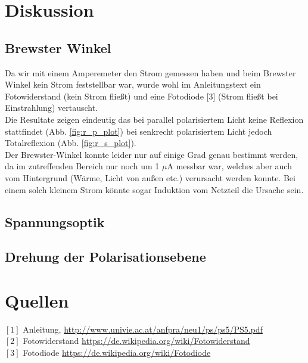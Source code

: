 \documentclass[12pt,a4paper]{article}
\begin{document}
\begin{multicols}{2}
\section{Diskussion}

\subsection{Brewster Winkel}
Da wir mit einem Amperemeter den Strom gemessen haben und beim Brewster Winkel kein Strom feststellbar war, wurde wohl im Anleitungstext ein Fotowiderstand (kein Strom fließt) und eine Fotodiode [3] (Strom fließt bei Einstrahlung) vertauscht. \\
Die Resultate zeigen eindeutig das bei parallel polarisiertem Licht keine Reflexion stattfindet  (Abb. \ref{fig:r_p_plot}) bei senkrecht polarisiertem Licht jedoch Totalreflexion (Abb. \ref{fig:r_s_plot}). \\
Der Brewster-Winkel konnte leider nur auf einige Grad genau bestimmt werden, da im zutreffenden Bereich nur noch um 1 $\mu$A messbar war, welches aber auch vom Hintergrund (Wärme, Licht von außen etc.) verursacht werden konnte. Bei einem solch kleinem Strom könnte sogar Induktion vom Netzteil die Ursache sein.


\subsection{Spannungsoptik}




\subsection{Drehung der Polarisationsebene}




\section{Quellen}
$[1]$ Anleitung, \url{http://www.univie.ac.at/anfpra/neu1/ps/ps5/PS5.pdf}\\
$[2]$ Fotowiderstand \url{https://de.wikipedia.org/wiki/Fotowiderstand}\\
$[3]$ Fotodiode \url{https://de.wikipedia.org/wiki/Fotodiode}\\
\end{multicols}
\end{document}
